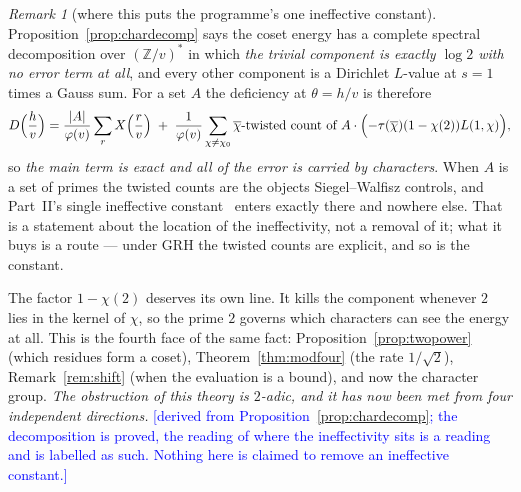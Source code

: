 \documentclass[11pt,a4paper]{article}
\theoremstyle{plain}
\theoremstyle{definition}
\theoremstyle{remark}
\newtheorem{remark}[theorem]{Remark}
\newcommand{\STATUS}[1]{\textcolor{blue}{\textsf{[#1]}}}
\begin{document}
\begin{remark}[where this puts the programme's one ineffective constant]\label{rem:ineffective}
Proposition~\ref{prop:chardecomp} says the coset energy has a complete spectral decomposition
over $(\mathbb{Z}/v)^{*}$ in which \emph{the trivial component is exactly $\log2$ with no error
term at all}, and every other component is a Dirichlet $L$-value at $s=1$ times a Gauss sum.
For a set $A$ the deficiency at $\theta=h/v$ is therefore
\[
  D\Bigl(\frac hv\Bigr)=\frac{|A|}{\varphi(v)}\sum_{r}X\Bigl(\frac rv\Bigr)
  \;+\;\frac1{\varphi(v)}\sum_{\chi\ne\chi_{0}}\overline{\chi}\text{-twisted count of }A
       \cdot\Bigl(-\tau(\overline{\chi})(1-\chi(2))L(1,\chi)\Bigr),
\]
so \emph{the main term is exact and all of the error is carried by characters}. When $A$ is a
set of primes the twisted counts are the objects Siegel--Walfisz controls, and Part~II's single
ineffective constant~\cite{P2} enters exactly there and nowhere else. That is a statement about
the location of the ineffectivity, not a removal of it; what it buys is a route --- under GRH the
twisted counts are explicit, and so is the constant.

The factor $1-\chi(2)$ deserves its own line. It kills the component whenever $2$ lies in the
kernel of $\chi$, so the prime $2$ governs which characters can see the energy at all. This is
the fourth face of the same fact: Proposition~\ref{prop:twopower} (which residues form a coset),
Theorem~\ref{thm:modfour} (the rate $1/\sqrt2$), Remark~\ref{rem:shift} (when the evaluation is a
bound), and now the character group. \emph{The obstruction of this theory is $2$-adic, and it has
now been met from four independent directions.}
\STATUS{derived from Proposition~\ref{prop:chardecomp}; the decomposition is proved, the reading
of where the ineffectivity sits is a reading and is labelled as such. Nothing here is claimed to
remove an ineffective constant.}
\end{remark}
\end{document}
